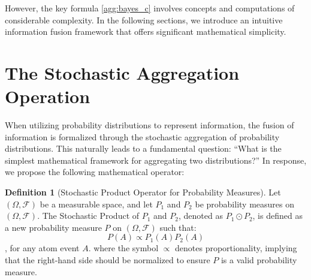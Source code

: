 \documentclass[letterpaper]{article} %
\theoremstyle{definition}
\newtheorem{definition}[theorem]{Definition}
\theoremstyle{remark}
\begin{document}
However, the key formula \eqref{agg:bayes_c} involves concepts and computations of considerable complexity. In the following sections, we introduce an intuitive information fusion framework that offers significant mathematical simplicity.



\section{The Stochastic Aggregation Operation}


When utilizing probability distributions to represent information, the fusion of information is formalized through the stochastic aggregation of probability distributions. This naturally leads to a fundamental question: ``What is the simplest mathematical framework for aggregating two distributions?'' In response, we propose the following mathematical operator:




\begin{definition}[Stochastic Product Operator for Probability Measures]
Let $(\Omega, \mathcal{F})$ be a measurable space, and let $P_1$ and $P_2$ be probability measures on $(\Omega, \mathcal{F})$. The Stochastic Product of $P_1$ and $P_2$, denoted as $P_1 \odot P_2$, is defined as a new probability measure $P$ on $(\Omega, \mathcal{F})$ such that:
\begin{equation}
    P(A) \propto P_1(A)P_2(A)
\end{equation}
, for any atom event $A$.  where the symbol $\propto$ denotes proportionality, implying that the right-hand side should be normalized to ensure $P$ is a valid probability measure.
\end{definition}
\end{document}
